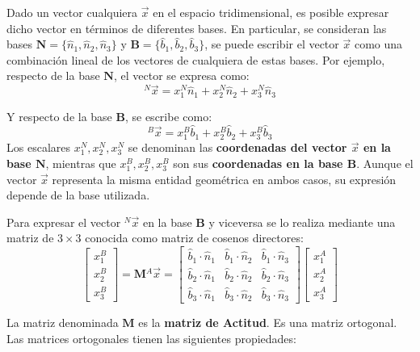 Dado un vector cualquiera $\vec{x}$ en el espacio tridimensional, es posible expresar dicho vector en términos de diferentes bases. En particular, se consideran las bases $\mathbf{N} = \{\hat{n}_1, \hat{n}_2, \hat{n}_3\}$ y $\mathbf{B} = \{\hat{b}_1, \hat{b}_2, \hat{b}_3\}$, se puede escribir el vector $\vec{x}$ como una combinación lineal de los vectores de cualquiera de estas bases. Por ejemplo, respecto de la base $\mathbf{N}$, el vector se expresa como:
\begin{equation}
	^N\vec{x} = x_1^N \hat{n}_1 + x_2^N \hat{n}_2 + x_3^N \hat{n}_3
\end{equation}

Y respecto de la base $\mathbf{B}$, se escribe como:
\begin{equation}
	^B\vec{x} = x_1^B \hat{b}_1 + x_2^B \hat{b}_2 + x_3^B \hat{b}_3
\end{equation}
Los escalares $x_1^N, x_2^N, x_3^N$ se denominan las \textbf{coordenadas del vector $\vec{x}$ en la base $\mathbf{N}$}, mientras que $x_1^B, x_2^B, x_3^B$ son sus \textbf{coordenadas en la base $\mathbf{B}$}. Aunque el vector $\vec{x}$ representa la misma entidad geométrica en ambos casos, su expresión depende de la base utilizada.

Para expresar el vector $^N\vec{x}$ en la base  $\mathbf{B}$ y viceversa se lo realiza mediante una matriz de $3 \times 3$ conocida como matriz de cosenos directores: 
\begin{equation}
	\begin{bmatrix}
		x_1^B \\
		x_2^B \\
		x_3^B
	\end{bmatrix}
	= \mathbf{M} {^A\vec{x}} = 
	\begin{bmatrix}
		\hat{b}_1 \cdot \hat{n}_1  & \hat{b}_1 \cdot \hat{n}_2  &  \hat{b}_1 \cdot \hat{n}_3  \\
		\hat{b}_2 \cdot \hat{n}_1  & \hat{b}_2 \cdot \hat{n}_2  &  \hat{b}_2 \cdot \hat{n}_3 \\
		\hat{b}_3 \cdot \hat{n}_1  & \hat{b}_3 \cdot \hat{n}_2  & \hat{b}_3 \cdot \hat{n}_3  
	\end{bmatrix}
	\begin{bmatrix}
		x_1^A \\
		x_2^A \\
		x_3^A
	\end{bmatrix}
\end{equation}

La matriz denominada  $\mathbf{M}$ es la \textbf{matriz de Actitud}. Es una matriz ortogonal. Las matrices ortogonales tienen las siguientes propiedades: 

